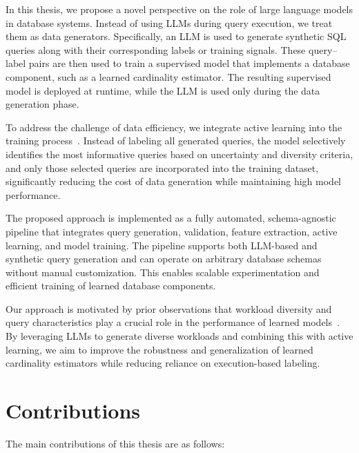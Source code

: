 In this thesis, we propose a novel perspective on the role of large language models in database systems. Instead of using LLMs during query execution, we treat them as data generators. Specifically, an LLM is used to generate synthetic SQL queries along with their corresponding labels or training signals. These query--label pairs are then used to train a supervised model that implements a database component, such as a learned cardinality estimator. The resulting supervised model is deployed at runtime, while the LLM is used only during the data generation phase.

To address the challenge of data efficiency, we integrate active learning into the training process~\cite{DeepActiveLearningSurvey2024}. Instead of labeling all generated queries, the model selectively identifies the most informative queries based on uncertainty and diversity criteria, and only those selected queries are incorporated into the training dataset, significantly reducing the cost of data generation while maintaining high model performance.

The proposed approach is implemented as a fully automated, schema-agnostic pipeline that integrates query generation, validation, feature extraction, active learning, and model training. The pipeline supports both LLM-based and synthetic query generation and can operate on arbitrary database schemas without manual customization. This enables scalable experimentation and efficient training of learned database components.

Our approach is motivated by prior observations that workload diversity and query characteristics play a crucial role in the performance of learned models~\cite{DBLP:journals/pvldb/WangQWWZ21}. By leveraging LLMs to generate diverse workloads and combining this with active learning, we aim to improve the robustness and generalization of learned cardinality estimators while reducing reliance on execution-based labeling.

\section{Contributions}

The main contributions of this thesis are as follows:

